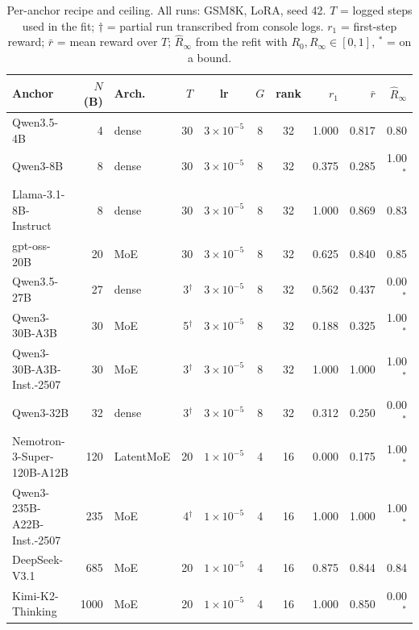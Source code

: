 \documentclass[11pt]{article}
\begin{document}
\begin{table}[ht]
\centering
\caption{Per-anchor recipe and ceiling. All runs: GSM8K, LoRA, seed 42.
$T$ = logged steps used in the fit; $\dagger$ = partial run transcribed from
console logs. $r_1$ = first-step reward; $\bar r$ = mean reward over $T$;
$\hat R_\infty$ from the refit with $R_0,R_\infty\in[0,1]$, $^{*}$ = on a bound.}
\label{tab:panel}
\small
\begin{tabular}{@{}lrlrcccrrr@{}}
\toprule
Anchor & $N$ (B) & Arch. & $T$ & lr & $G$ & rank & $r_1$ & $\bar r$ & $\hat R_\infty$ \\
\midrule
Qwen3.5-4B & 4 & dense & 30 & $3{\times}10^{-5}$ & 8 & 32 & 1.000 & 0.817 & 0.80 \\
Qwen3-8B & 8 & dense & 30 & $3{\times}10^{-5}$ & 8 & 32 & 0.375 & 0.285 & 1.00$^{*}$ \\
Llama-3.1-8B-Instruct & 8 & dense & 30 & $3{\times}10^{-5}$ & 8 & 32 & 1.000 & 0.869 & 0.83 \\
gpt-oss-20B & 20 & MoE & 30 & $3{\times}10^{-5}$ & 8 & 32 & 0.625 & 0.840 & 0.85 \\
Qwen3.5-27B & 27 & dense & 3$^\dagger$ & $3{\times}10^{-5}$ & 8 & 32 & 0.562 & 0.437 & 0.00$^{*}$ \\
Qwen3-30B-A3B & 30 & MoE & 5$^\dagger$ & $3{\times}10^{-5}$ & 8 & 32 & 0.188 & 0.325 & 1.00$^{*}$ \\
Qwen3-30B-A3B-Inst.-2507 & 30 & MoE & 3$^\dagger$ & $3{\times}10^{-5}$ & 8 & 32 & 1.000 & 1.000 & 1.00$^{*}$ \\
Qwen3-32B & 32 & dense & 3$^\dagger$ & $3{\times}10^{-5}$ & 8 & 32 & 0.312 & 0.250 & 0.00$^{*}$ \\
Nemotron-3-Super-120B-A12B & 120 & LatentMoE & 20 & $1{\times}10^{-5}$ & 4 & 16 & 0.000 & 0.175 & 1.00$^{*}$ \\
Qwen3-235B-A22B-Inst.-2507 & 235 & MoE & 4$^\dagger$ & $1{\times}10^{-5}$ & 4 & 16 & 1.000 & 1.000 & 1.00$^{*}$ \\
DeepSeek-V3.1 & 685 & MoE & 20 & $1{\times}10^{-5}$ & 4 & 16 & 0.875 & 0.844 & 0.84 \\
Kimi-K2-Thinking & 1000 & MoE & 20 & $1{\times}10^{-5}$ & 4 & 16 & 1.000 & 0.850 & 0.00$^{*}$ \\
\bottomrule
\end{tabular}
\end{table}
\end{document}
